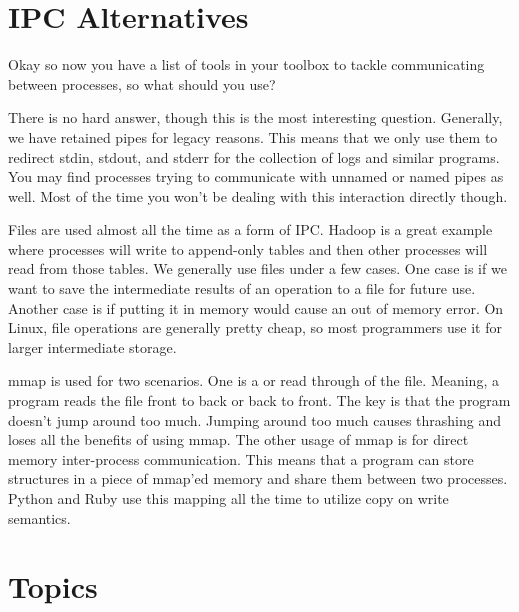\section{IPC Alternatives}
	 
Okay so now you have a list of tools in your toolbox to tackle communicating between processes, so what should you use?
	 
There is no hard answer, though this is the most interesting question.
Generally, we have retained pipes for legacy reasons.
This means that we only use them to redirect stdin, stdout, and stderr for the collection of logs and similar programs.
You may find processes trying to communicate with unnamed or named pipes as well.
Most of the time you won't be dealing with this interaction directly though.
	 
Files are used almost all the time as a form of IPC.
Hadoop is a great example where processes will write to append-only tables and then other processes will read from those tables.
We generally use files under a few cases.
One case is if we want to save the intermediate results of an operation to a file for future use.
Another case is if putting it in memory would cause an out of memory error.
On Linux, file operations are generally pretty cheap, so most programmers use it for larger intermediate storage.
	 
mmap is used for two scenarios.
One is a  or  read through of the file.
Meaning, a program reads the file front to back or back to front.
The key is that the program doesn't jump around too much.
Jumping around too much causes thrashing and loses all the benefits of using mmap.
The other usage of mmap is for direct memory inter-process communication.
This means that a program can store structures in a piece of mmap'ed memory and share them between two processes.
Python and Ruby use this mapping all the time to utilize copy on write semantics.
	 
\section{Topics}
	 
